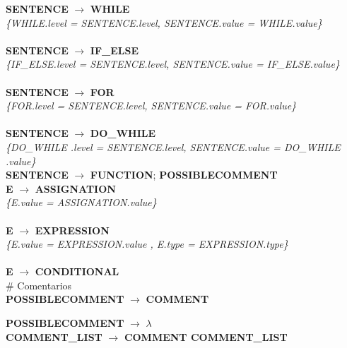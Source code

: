 \documentclass[10pt,a4paper]{article}
\begin{document}
\textbf{SENTENCE} $\rightarrow$ \textbf{WHILE} \\ 

\textit{\{WHILE.level = SENTENCE.level, SENTENCE.value = WHILE.value\}}  \\ \\

\textbf{SENTENCE} $\rightarrow$ \textbf{IF\_ELSE}  \\ 

\textit{\{IF\_ELSE.level = SENTENCE.level, SENTENCE.value = IF\_ELSE.value\}}  \\ \\

\textbf{SENTENCE} $\rightarrow$ \textbf{FOR} \\ 

\textit{\{FOR.level = SENTENCE.level, SENTENCE.value = FOR.value\}}  \\ \\

\textbf{SENTENCE} $\rightarrow$ \textbf{DO\_WHILE} \\ 

\textit{\{DO\_WHILE .level = SENTENCE.level, SENTENCE.value = DO\_WHILE .value\}}  \\

\textbf{SENTENCE} $\rightarrow$ \textbf{FUNCTION}; \textbf{POSSIBLECOMMENT} \\

\textbf{E} $\rightarrow$ \textbf{ASSIGNATION}   \\

\textit{\{E.value = ASSIGNATION.value\}} \\ \\

\textbf{E} $\rightarrow$ \textbf{EXPRESSION} \\

\textit{\{E.value = EXPRESSION.value  , E.type = EXPRESSION.type\}}  \\ \\

\textbf{E} $\rightarrow$ \textbf{CONDITIONAL} \\

\# Comentarios\\
\textbf{POSSIBLECOMMENT} $\rightarrow$ \textbf{COMMENT}

\textbf{POSSIBLECOMMENT} $\rightarrow$ $\lambda$ \\

\textbf{COMMENT\_LIST} $\rightarrow$ \textbf{COMMENT COMMENT\_LIST} 
\end{document}
